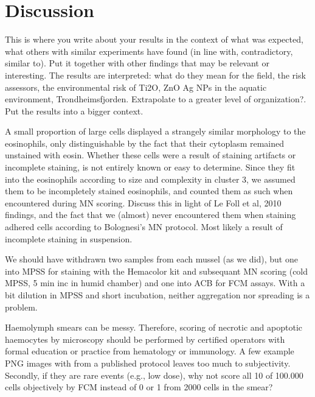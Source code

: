 \chapter{Discussion}
\label{chap:discuss}

This is where you write about your results in the context of what was expected, what others with similar experiments have found (in line with, contradictory, similar to). Put it together with other findings that may be relevant or interesting. The results are interpreted: what do they mean for the field, the risk assessors, the environmental risk of Ti2O, ZnO Ag NPs in the aquatic environment, Trondheimsfjorden. Extrapolate to a greater level of organization?. Put the results into a bigger context.

A small proportion of large cells displayed a strangely similar morphology to the eosinophils, only distinguishable by the fact that their cytoplasm remained unstained with eosin. Whether these cells were a result of staining artifacts or incomplete staining, is not entirely known or easy to determine. Since they fit into the eosinophils according to size and complexity in cluster 3, we assumed them to be incompletely stained eosinophils, and counted them as such when encountered during MN scoring. Discuss this in light of Le Foll et al, 2010 findings, and the fact that we (almost) never encountered them when staining adhered cells according to Bolognesi's MN protocol. Most likely a result of incomplete staining in suspension.

We should have withdrawn two samples from each mussel (as we did), but one into MPSS for staining with the Hemacolor kit and subsequant MN scoring (cold MPSS, 5 min inc in humid chamber) and one into ACB for FCM assays. With a bit dilution in MPSS and short incubation, neither aggregation nor spreading is a problem.

Haemolymph smears can be messy. Therefore, scoring of necrotic and apoptotic haemocytes by microscopy should be performed by certified operators with formal education or practice from hematology or immunology. A few example PNG images with from a published protocol leaves too much to subjectivity. Secondly, if they are rare events (e.g., low dose), why not score all 10 of 100.000 cells objectively by FCM instead of 0 or 1 from 2000 cells in the smear?